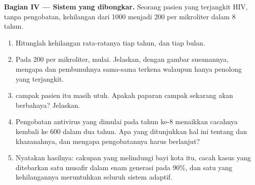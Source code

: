 \begin{problem}
\medskip
\noindent\textbf{Bagian IV --- Sistem yang dibongkar.}
Seorang pasien yang terjangkit HIV, tanpa pengobatan, kehilangan  dari 1000 menjadi 200 per mikroliter dalam 8 tahun.
\begin{enumerate}[resume]
  \item Hitunglah kehilangan rata-ratanya tiap tahun, dan tiap bulan.
  \item Pada 200 per mikroliter,  mulai. Jelaskan, dengan gambar
        susunannya, mengapa  dan  pembunuhnya sama-sama
        terkena walaupun hanya  penolong yang terjangkit.
  \item {} campak pasien itu masih utuh. Apakah paparan
        campak sekarang akan berbahaya? Jelaskan.
  \item Pengobatan antivirus yang dimulai pada tahun ke-8 menaikkan
        cacahnya kembali ke 600 dalam dua tahun. Apa yang ditunjukkan
        hal ini tentang  dan khazanahnya, dan mengapa
        pengobatannya harus berlanjut?
  \item Nyatakan hasilnya: cakupan yang melindungi bayi kota itu,
        cacah kasus yang ditebarkan satu musafir dalam enam generasi
        pada 90\%, dan satu  yang kehilangannya meruntuhkan seluruh
        sistem adaptif.
\end{enumerate}
\end{problem}

